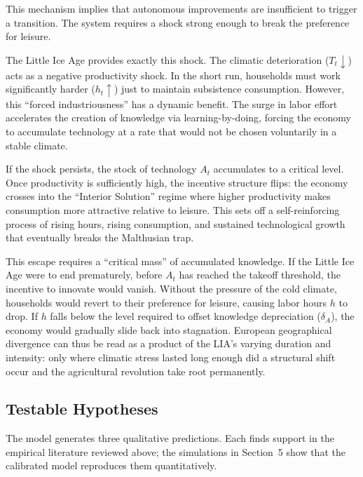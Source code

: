 \documentclass[11pt,a4paper]{article}
\begin{document}
This mechanism implies that autonomous improvements are insufficient to trigger a transition. The system requires a shock strong enough to break the preference for leisure.

The Little Ice Age provides exactly this shock. The climatic deterioration (\(T_t \downarrow\)) acts as a negative productivity shock. In the short run, households must work significantly harder (\(h_t \uparrow\)) just to maintain subsistence consumption. However, this ``forced industriousness'' has a dynamic benefit. The surge in labor effort accelerates the creation of knowledge via learning-by-doing, forcing the economy to accumulate technology at a rate that would not be chosen voluntarily in a stable climate.

If the shock persists, the stock of technology \(A_t\) accumulates to a critical level. Once productivity is sufficiently high, the incentive structure flips: the economy crosses into the ``Interior Solution'' regime where higher productivity makes consumption more attractive relative to leisure. This sets off a self-reinforcing process of rising hours, rising consumption, and sustained technological growth that eventually breaks the Malthusian trap.

This escape requires a ``critical mass'' of accumulated knowledge. If the Little Ice Age were to end prematurely, before \(A_t\) has reached the takeoff threshold, the incentive to innovate would vanish. Without the pressure of the cold climate, households would revert to their preference for leisure, causing labor hours \(h\) to drop. If \(h\) falls below the level required to offset knowledge depreciation (\(\delta_A\)), the economy would gradually slide back into stagnation. European geographical divergence can thus be read as a product of the LIA's varying duration and intensity: only where climatic stress lasted long enough did a structural shift occur and the agricultural revolution take root permanently.

\subsection*{Testable Hypotheses}
The model generates three qualitative predictions. Each finds support in the empirical literature reviewed above; the simulations in Section~5 show that the calibrated model reproduces them quantitatively.
\end{document}
